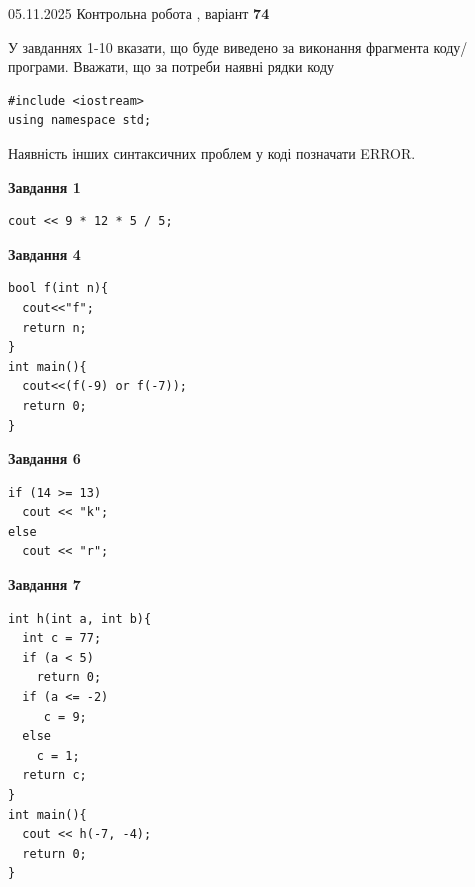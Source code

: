 \documentclass[12pt, ukrainian]{article}
\begin{document}
{\Large{05.11.2025 Контрольна робота , варіант  \No \textbf { 74 }\par}}
{
\begin {large}
У завданнях 1-10 вказати, що буде виведено за виконання фрагмента коду/про\-гра\-ми.
Вважати, що за потреби наявні рядки коду
\begin{verbatim}
#include <iostream>
using namespace std;
\end{verbatim}
Наявність інших синтаксичних проблем у коді позначати ERROR.

\begin{minipage}[t]{7.0cm}

\begin{center}
\textbf{Завдання 1}
\end{center}
\vspace{-8mm}

\begin{verbatim}
cout << 9 * 12 * 5 / 5;
\end{verbatim}



\begin{center}
\textbf{Завдання 4}
\end{center}
\vspace{-8mm}

\begin{verbatim}
bool f(int n){
  cout<<"f";
  return n;
}
int main(){
  cout<<(f(-9) or f(-7));
  return 0;
}
\end{verbatim}



\begin{center}
\textbf{Завдання 6}
\end{center}
\vspace{-8mm}

\begin{verbatim}
if (14 >= 13)
  cout << "k";
else
  cout << "r";
\end{verbatim}



\begin{center}
\textbf{Завдання 7}
\end{center}
\vspace{-8mm}

\begin{verbatim}
int h(int a, int b){
  int c = 77;
  if (a < 5)
    return 0;
  if (a <= -2)
     c = 9;
  else
    c = 1;
  return c;
}
int main(){
  cout << h(-7, -4);
  return 0;
}
\end{verbatim}


\end{minipage}
\end{large}}
\end{document}
